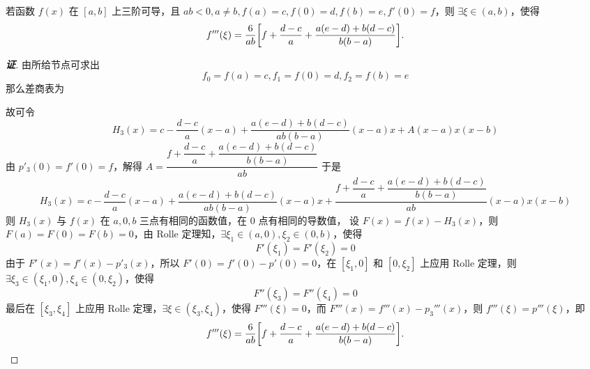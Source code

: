 \begin{theorem}
    若函数 $f(x)\text{ 在 }[a,b]$ 上三阶可导，且 $ab<0,a\neq b,f(a)=c,f(0)=d,f(b)=e,f'(0)=f$，则 $\exists\xi\in(a,b)$，使得 $$f'''(\xi)=\dfrac{6}{ab}\qty[f+\dfrac{d-c}{a}+\dfrac{a(e-d)+b(d-c)}{b(b-a)}].$$
\end{theorem}
\begin{proof}[{\songti \textbf{证}}]
    由所给节点可求出 $$f_0=f(a)=c,f_1=f(0)=d,f_2=f(b)=e$$
    那么差商表为
    \begin{table}[H]
        \centering
        \caption{}
    \end{table}
    故可令 $$H_3(x)=c-\dfrac{d-c}{a}(x-a)+\dfrac{a(e-d)+b(d-c)}{ab(b-a)}(x-a)x+A(x-a)x(x-b)$$
    由 $p'_3(0)=f'(0)=f$，解得 $A=\dfrac{f+\dfrac{d-c}{a}+\dfrac{a(e-d)+b(d-c)}{b(b-a)}}{ab}$
    于是 $$H_3(x)=c-\dfrac{d-c}{a}(x-a)+\dfrac{a(e-d)+b(d-c)}{ab(b-a)}(x-a)x+\dfrac{f+\dfrac{d-c}{a}+\dfrac{a(e-d)+b(d-c)}{b(b-a)}}{ab}(x-a)x(x-b)$$
    则 $H_3(x)$ 与 $f(x)$ 在 $a,0,b$ 三点有相同的函数值，在 $0$ 点有相同的导数值，
    设 $F(x)=f(x)-H_3(x)$，则 $F(a)=F(0)=F(b)=0$，由 Rolle 定理知，$\exists\xi_1\in(a,0),\xi_2\in(0,b)$，使得 $$F'(\xi_1)=F'(\xi_2)=0$$
    由于 $F'(x)=f'(x)-p'_3(x)$，所以 $F'(0)=f'(0)-p'(0)=0$，在 $[\xi_1,0]$ 和 $[0,\xi_2]$ 上应用 Rolle 定理，则 $\exists\xi_3\in(\xi_1,0),\xi_4\in(0,\xi_2)$，使得 $$F''(\xi_3)=F''(\xi_4)=0$$
    最后在 $[\xi_3,\xi_4]$ 上应用 Rolle 定理，$\exists\xi\in(\xi_3,\xi_4)$，使得 $F'''(\xi)=0$，而 $F'''(x)=f'''(x)-p_3'''(x)$，则 $f'''(\xi)=p'''(\xi)$，即
    $$f'''(\xi)=\dfrac{6}{ab}\qty[f+\dfrac{d-c}{a}+\dfrac{a(e-d)+b(d-c)}{b(b-a)}].$$
\end{proof}
